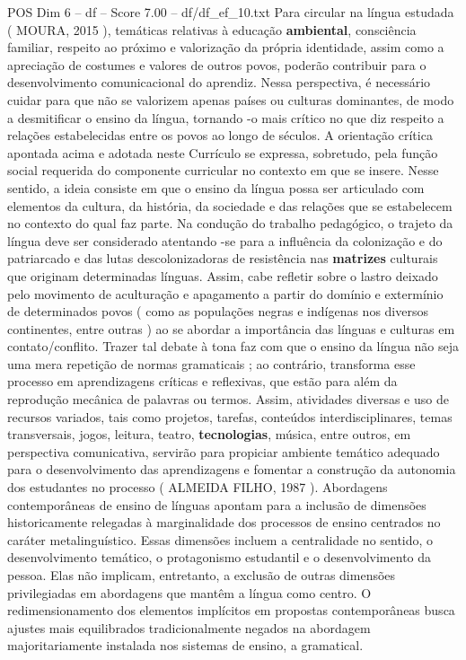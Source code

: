 \begin{textsample}{POS Dim 6 – df – Score 7.00 – df/df\_ef\_10.txt}
Para circular na língua estudada ( MOURA, 2015 ), temáticas relativas à educação \textbf{ambiental}, consciência familiar, respeito ao próximo e valorização da própria identidade, assim como a apreciação de costumes e valores de outros povos, poderão contribuir para o desenvolvimento comunicacional do aprendiz.
Nessa perspectiva, é necessário cuidar para que não se valorizem apenas países ou culturas dominantes, de modo a desmitificar o ensino da língua, tornando -o mais crítico no que diz respeito a relações estabelecidas entre os povos ao longo de séculos.
A orientação crítica apontada acima e adotada neste Currículo se expressa, sobretudo, pela função social requerida do componente curricular no contexto em que se insere.
Nesse sentido, a ideia consiste em que o ensino da língua possa ser articulado com elementos da cultura, da história, da sociedade e das relações que se estabelecem no contexto do qual faz parte.
Na condução do trabalho pedagógico, o trajeto da língua deve ser considerado atentando -se para a influência da colonização e do patriarcado e das lutas descolonizadoras de resistência nas \textbf{matrizes} culturais que originam determinadas línguas.
Assim, cabe refletir sobre o lastro deixado pelo movimento de aculturação e apagamento a partir do domínio e extermínio de determinados povos ( como as populações negras e indígenas nos diversos continentes, entre outras ) ao se abordar a importância das línguas e culturas em contato/conflito.
Trazer tal debate à tona faz com que o ensino da língua não seja uma mera repetição de normas gramaticais ; ao contrário, transforma esse processo em aprendizagens críticas e reflexivas, que estão para além da reprodução mecânica de palavras ou termos.
Assim, atividades diversas e uso de recursos variados, tais como projetos, tarefas, conteúdos interdisciplinares, temas transversais, jogos, leitura, teatro, \textbf{tecnologias}, música, entre outros, em perspectiva comunicativa, servirão para propiciar ambiente temático adequado para o desenvolvimento das aprendizagens e fomentar a construção da autonomia dos estudantes no processo ( ALMEIDA FILHO, 1987 ).
Abordagens contemporâneas de ensino de línguas apontam para a inclusão de dimensões historicamente relegadas à marginalidade dos processos de ensino centrados no caráter metalinguístico.
Essas dimensões incluem a centralidade no sentido, o desenvolvimento temático, o protagonismo estudantil e o desenvolvimento da pessoa.
Elas não implicam, entretanto, a exclusão de outras dimensões privilegiadas em abordagens que mantêm a língua como centro.
O redimensionamento dos elementos implícitos em propostas contemporâneas busca ajustes mais equilibrados tradicionalmente negados na abordagem majoritariamente instalada nos sistemas de ensino, a gramatical.

\end{textsample}
